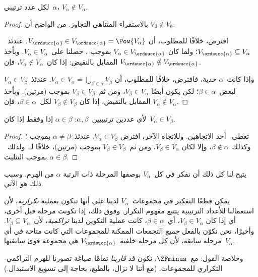\documentclass[../../../include/open-logic-section]{subfiles}
\begin{document}
\begin{lem}
لكل عدد ترتيبي~$\alpha$، $V_\alpha \notin V_\alpha$.
\end{lem}

\begin{proof}
بالاستقراء المتناهي التجاوز. من الواضح أن
$V_\emptyset \notin V_\emptyset$.

افترض، خلافًا للمطلوب، أن
$V_{\ordsucc{\alpha}} \in V_{\ordsucc{\alpha}} = \Pow{V_\alpha}$.
عندئذ~$V_{\ordsucc{\alpha}} \subseteq V_\alpha$؛ ولما كان
$V_\alpha \in V_{\ordsucc{\alpha}}$ بموجب
، حصلنا على~$V_\alpha \in V_\alpha$. وبأخذ
المقابل بالنقيض: إذا كان~$V_\alpha \notin V_\alpha$، فإن
$V_{\ordsucc{\alpha}} \notin V_{\ordsucc{\alpha}}$.

وإذا كانت~$\alpha$ حدية، فافترض، خلافًا للمطلوب، أن
$V_\alpha \in V_\alpha = \bigcup_{\beta \in \alpha}V_\beta$.
عندئذ~$V_\alpha \in V_\beta$ لبعض~$\beta \in \alpha$؛ لكن يكون أيضًا
$V_\beta \in V_\alpha$، ومن ثم~$V_\beta \in V_\beta$ بموجب
 (مرتين). وبأخذ المقابل بالنقيض، إذا كان
$V_\beta \notin V_\beta$ لكل~$\beta \in \alpha$، فإن
$V_\alpha \notin V_\alpha$.
\end{proof}

\begin{cor}
لأي عددين ترتيبيين~$\alpha, \beta$:
$\alpha \in \beta$ إذا وفقط إذا كان~$V_\alpha \in V_\beta$.
\end{cor}

\begin{proof}
تعطي~ أحد الاتجاهين. وللاتجاه الآخر، افترض
$V_\alpha \in V_\beta$. عندئذ~$\alpha \neq \beta$ بموجب
؛ وكذلك~$\beta \notin \alpha$، وإلا لكان
$V_\beta \in V_\alpha$، ومن ثم~$V_\beta \in V_\beta$ بموجب
 (مرتين)، خلافًا لـ.
ولذلك~$\alpha \in \beta$ بموجب التثليث.
\end{proof}
\noindent
يتيح لنا كل ذلك أن نفكر في كل~$V_\alpha$ بوصفها المرحلة ذات الرتبة
$\alpha$ من الهرم. وسبب ذلك هو الآتي.

يمكن قطعًا التفكير في مجموعات~$V_\alpha$ لدينا على أنها تتكون بعملية
\emph{تكرارية}، لأن استعمالنا للأعداد الترتيبية يتتبع مفهوم التكرار.
وفوق ذلك، إذا تكونت مرحلة قبل أخرى، أي إذا كان
$V_\beta \in V_\alpha$، أي~$\beta \in \alpha$، كانت عملية التكوين
لدينا \emph{تراكمية}، لأن~$V_\beta \subseteq V_\alpha$. وأخيرًا، نحن
نكوّن بالفعل \emph{جميع} التجمعات الممكنة للمجموعات التي كانت متاحة
في أي مرحلة سابقة، لأن كل مرحلة خلفية~$V_{\ordsucc{\alpha}}$ هي
مجموعة قوى سابقتها~$V_\alpha$.

وخلاصة القول: مع~$\ZFminus$، نكون قد \emph{قاربنا} تمامًا صياغة
تصورنا للهرم التراكمي-التكراري للمجموعات. (مع أننا لا نزال، بالطبع،
بحاجة إلى تسويغ الاستبدال.)
\end{document}
